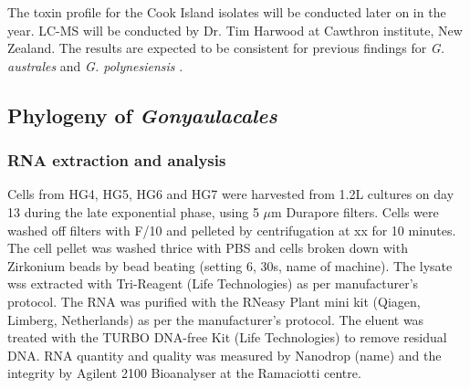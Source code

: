 \documentclass[12pt]{article}
\begin{document}
The toxin profile for the Cook Island isolates will be conducted later on in the year. LC-MS will be conducted by Dr. Tim Harwood at Cawthron institute, New Zealand. The results are expected to be consistent for previous findings for \emph{G. australes} and \emph{G. polynesiensis} \cite{chinain2010growth,rhodes2014production}.
 

\subsection{Phylogeny of \emph{Gonyaulacales}}

\subsubsection{RNA extraction and analysis}
Cells from HG4, HG5, HG6 and HG7 were harvested from 1.2L cultures on day 13 during the late exponential phase, using 5 $\mu$m Durapore filters. Cells were washed off filters with F/10 and pelleted by centrifugation at xx for 10 minutes. The cell pellet was washed thrice with PBS and cells broken down with Zirkonium beads by bead beating (setting 6, 30s, name of machine). The lysate wss extracted with Tri-Reagent (Life Technologies) as per manufacturer's protocol. The RNA was purified with the RNeasy Plant mini kit (Qiagen, Limberg, Netherlands) as per the manufacturer's protocol. The eluent was treated with the TURBO DNA-free Kit (Life Technologies) to remove residual DNA. RNA quantity and quality was measured by Nanodrop (name) and the integrity by Agilent 2100 Bioanalyser  at the Ramaciotti centre.





\end{document}

